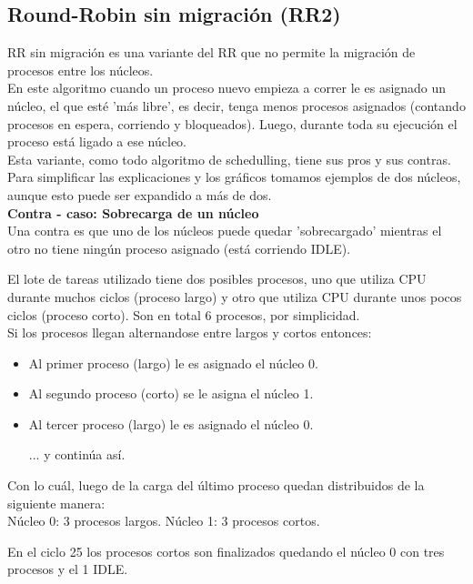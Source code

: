 \subsection{Round-Robin sin migración (RR2)}

RR sin migración es una variante del RR que no permite la migración de procesos
entre los núcleos.\\

En este algoritmo cuando un proceso nuevo empieza a correr le es asignado
un núcleo, el que esté 'más libre', es decir, tenga menos procesos asignados
(contando procesos en espera, corriendo y bloqueados).
Luego, durante toda su ejecución el proceso está ligado a ese núcleo.\\

Esta variante, como todo algoritmo de schedulling, tiene sus pros y sus contras.\\
Para simplificar las explicaciones y los gráficos tomamos ejemplos de 
dos núcleos, aunque esto puede ser expandido a más de dos.\\

\textbf{Contra - caso: Sobrecarga de un núcleo}\\
Una contra es que uno de los núcleos puede quedar 'sobrecargado' mientras el
otro no tiene ningún proceso asignado (está corriendo IDLE).

El lote de tareas utilizado tiene dos posibles procesos, uno que utiliza CPU durante muchos ciclos (proceso largo)
y otro que utiliza CPU durante unos pocos ciclos (proceso corto). Son en total 6 procesos, por simplicidad.\\
Si los procesos llegan alternandose entre largos y cortos entonces:
\begin{itemize}
\item Al primer proceso (largo) le es asignado el núcleo 0.
\item Al segundo proceso (corto) se le asigna el núcleo 1.
\item Al tercer proceso (largo) le es asignado el núcleo 0.

... y continúa así.
\end{itemize}

Con lo cuál, luego de la carga del último proceso quedan distribuidos de la siguiente manera:\\ 
Núcleo 0: 3 procesos largos. Núcleo 1: 3 procesos cortos.

En el ciclo 25 los procesos cortos son finalizados quedando el núcleo 0 con tres procesos y el 1 IDLE.\\

